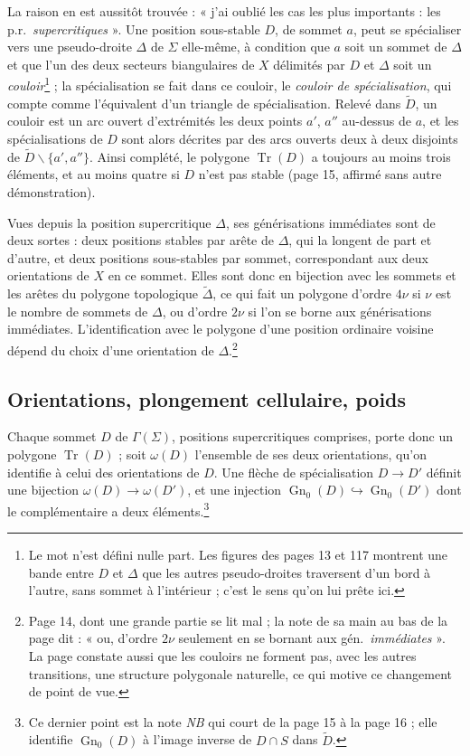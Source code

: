 \documentclass[11pt,a4paper]{article}
\begin{document}
La raison en est aussitôt trouvée : « j'ai oublié les cas les plus importants :
les p.r.\ \emph{supercritiques} ». Une position sous-stable $D$, de sommet $a$,
peut se spécialiser vers une pseudo-droite $\Delta$ de $\Sigma$ elle-même, à
condition que $a$ soit un sommet de $\Delta$ et que l'un des deux secteurs
biangulaires de $X$ délimités par $D$ et $\Delta$ soit un
\emph{couloir}\footnote{Le mot n'est défini nulle part. Les figures des pages 13
et 117 montrent une bande entre $D$ et $\Delta$ que les autres pseudo-droites
traversent d'un bord à l'autre, sans sommet à l'intérieur ; c'est le sens
qu'on lui prête ici.} ; la spécialisation se
fait dans ce couloir, le \emph{couloir de spécialisation}, qui compte comme
l'équivalent d'un triangle de spécialisation. Relevé dans $\widetilde{D}$, un
couloir est un arc ouvert d'extrémités les deux points $a'$, $a''$ au-dessus de
$a$, et les spécialisations de $D$ sont alors décrites par des arcs ouverts
deux à deux disjoints de $\widetilde{D} \smallsetminus \lbrace a', a''
\rbrace$. Ainsi complété, le polygone $\operatorname{Tr}(D)$ a toujours au moins
trois éléments, et au moins quatre si $D$ n'est pas stable (page 15, affirmé
sans autre démonstration).

Vues depuis la position supercritique $\Delta$, ses générisations immédiates
sont de deux sortes : deux positions stables par arête de $\Delta$, qui la
longent de part et d'autre, et deux positions sous-stables par sommet,
correspondant aux deux orientations de $X$ en ce sommet. Elles sont donc en
bijection avec les sommets et les arêtes du polygone topologique
$\widetilde{\Delta}$, ce qui fait un polygone d'ordre $4\nu$ si $\nu$ est le
nombre de sommets de $\Delta$, ou d'ordre $2\nu$ si l'on se borne aux
générisations immédiates. L'identification avec le polygone d'une position
ordinaire voisine dépend du choix d'une orientation de $\Delta$.\footnote{Page
14, dont une grande partie se lit mal ; la note de sa main au bas de la page
dit : « ou, d'ordre $2\nu$ seulement en se bornant aux gén.\ \emph{immédiates} ».
La page constate aussi que les couloirs ne forment pas, avec les autres
transitions, une structure polygonale naturelle, ce qui motive ce changement de
point de vue.}

\subsection*{Orientations, plongement cellulaire, poids}

Chaque sommet $D$ de $\Gamma(\Sigma)$, positions supercritiques comprises, porte
donc un polygone $\operatorname{Tr}(D)$ ; soit $\omega(D)$ l'ensemble de ses
deux orientations, qu'on identifie à celui des orientations de $D$. Une flèche
de spécialisation $D \to D'$ définit une bijection $\omega(D) \to \omega(D')$,
et une injection $\operatorname{Gn}_0(D) \hookrightarrow
\operatorname{Gn}_0(D')$ dont le complémentaire a deux éléments.\footnote{Ce
dernier point est la note \emph{NB} qui court de la page 15 à la page 16 ; elle
identifie $\operatorname{Gn}_0(D)$ à l'image inverse de $D \cap S$ dans
$\widetilde{D}$.}
\end{document}
